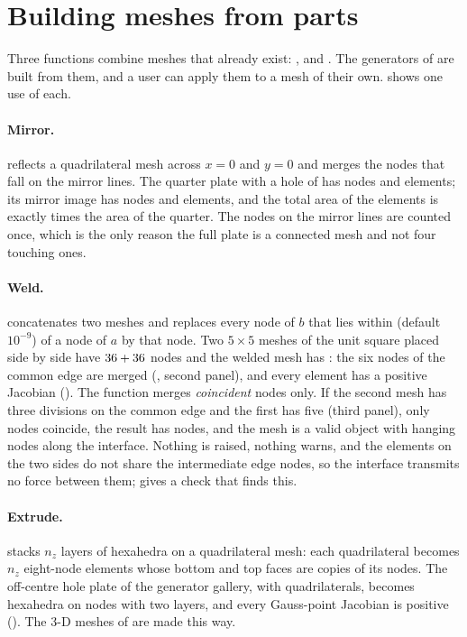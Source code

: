\section{Building meshes from parts}\label{sec:me-parts}

Three functions combine meshes that already exist: ,  and . The generators of  are built from them, and a user can apply them to a mesh of their own.  shows one use of each.

\paragraph{Mirror.}  reflects a quadrilateral mesh across $x=0$ and $y=0$ and merges the nodes that fall on the mirror lines. The quarter plate with a hole of  has \cmeMirQuarterNodes{} nodes and \cmeMirQuarterEl{} elements; its mirror image has \cmeMirFullNodes{} nodes and \cmeMirFullEl{} elements, and the total area of the elements is exactly \cmeMirAreaRatio{} times the area of the quarter. The nodes on the mirror lines are counted once, which is the only reason the full plate is a connected mesh and not four touching ones.

\paragraph{Weld.}  concatenates two meshes and replaces every node of $b$ that lies within  (default $10^{-9}$) of a node of $a$ by that node. Two $5\times5$ meshes of the unit square placed side by side have $36+36$ nodes and the welded mesh has \cmeWeldOut: the six nodes of the common edge are merged (, second panel), and every element has a positive Jacobian (\cmeWeldPos). The function merges \emph{coincident} nodes only. If the second mesh has three divisions on the common edge and the first has five (third panel), only \cmeWeldBadMerged{} nodes coincide, the result has \cmeWeldBadOut{} nodes, and the mesh is a valid  object with hanging nodes along the interface. Nothing is raised, nothing warns, and the elements on the two sides do not share the intermediate edge nodes, so the interface transmits no force between them;  gives a check that finds this.

\paragraph{Extrude.}  stacks $n_z$ layers of hexahedra on a quadrilateral mesh: each quadrilateral becomes $n_z$ eight-node elements whose bottom and top faces are copies of its nodes. The off-centre hole plate of the generator gallery, with \cmeExtQuads{} quadrilaterals, becomes \cmeExtHex{} hexahedra on \cmeExtNodes{} nodes with two layers, and every Gauss-point Jacobian is positive (\cmeExtPos). The 3-D meshes of  are made this way.

